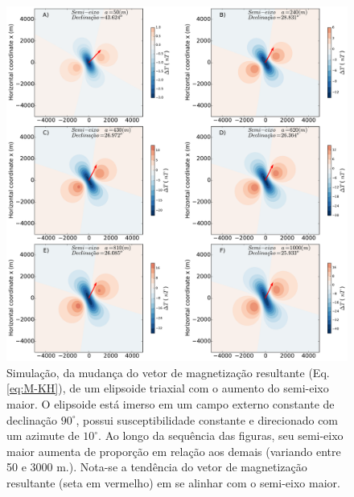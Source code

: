 \begin{figure}[hbt!]
	\centering \includegraphics[width=16 cm,height=16 cm]{figures/ellipsoid_shape_iso}
	\caption[Simulação, da mudança do vetor de magnetização resultante (Eq. \ref{eq:M-KH}), de um elipsoide triaxial com o aumento do semi-eixo maior. O elipsoide está imerso em um campo externo constante de declinação $90^{\circ}$, possui susceptibilidade constante e direcionado com um azimute de $10^{\circ}$. Ao longo da sequência das figuras, seu semi-eixo maior aumenta de proporção em relação aos demais (variando entre 50 e 3000 m.). Nota-se a tendência do vetor de magnetização resultante (seta em vermelho) em se alinhar com o semi-eixo maior.]
	{Simulação, da mudança do vetor de magnetização resultante (Eq. \ref{eq:M-KH}), de um elipsoide triaxial com o aumento do semi-eixo maior. O elipsoide está imerso em um campo externo constante de declinação $90^{\circ}$, possui susceptibilidade constante e direcionado com um azimute de $10^{\circ}$. Ao longo da sequência das figuras, seu semi-eixo maior aumenta de proporção em relação aos demais (variando entre 50 e 3000 m.). Nota-se a tendência do vetor de magnetização resultante (seta em vermelho) em se alinhar com o semi-eixo maior.}
	\label{fig:ellipsoid_shape_iso10}
\end{figure}
